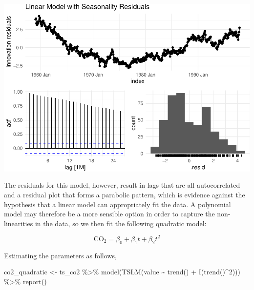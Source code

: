 \documentclass[AER]{AEA}
\newenvironment{Shaded}{\begin{snugshade}}{\end{snugshade}}
\newcommand{\DecValTok}[1]{\textcolor[rgb]{0.00,0.00,0.81}{#1}}
\newcommand{\FunctionTok}[1]{\textcolor[rgb]{0.00,0.00,0.00}{#1}}
\newcommand{\NormalTok}[1]{#1}
\newcommand{\OtherTok}[1]{\textcolor[rgb]{0.56,0.35,0.01}{#1}}
\newcommand{\SpecialCharTok}[1]{\textcolor[rgb]{0.00,0.00,0.00}{#1}}
\begin{document}
\includegraphics{co2_1997_Qian_files/figure-latex/seasonalized model residulas-1.pdf}

The residuals for this model, however, result in lags that are all
autocorrelated and a residual plot that forms a parabolic pattern, which
is evidence against the hypothesis that a linear model can appropriately
fit the data. A polynomial model may therefore be a more sensible option
in order to capture the non-linearities in the data, so we then fit the
following quadratic model:

\begin{equation}
\label{eq:one}
\text{CO}_{2} = \beta_0 + \beta_1 t + \beta_2 t^2
\end{equation}

Estimating the parameters as follows,

\begin{Shaded}
\begin{Highlighting}[]
\NormalTok{co2\_quadratic }\OtherTok{\textless{}{-}}\NormalTok{ ts\_co2 }\SpecialCharTok{\%\textgreater{}\%} 
    \FunctionTok{model}\NormalTok{(}\FunctionTok{TSLM}\NormalTok{(value }\SpecialCharTok{\textasciitilde{}} \FunctionTok{trend}\NormalTok{() }\SpecialCharTok{+} \FunctionTok{I}\NormalTok{(}\FunctionTok{trend}\NormalTok{()}\SpecialCharTok{\^{}}\DecValTok{2}\NormalTok{))) }\SpecialCharTok{\%\textgreater{}\%} 
    \FunctionTok{report}\NormalTok{()}
\end{Highlighting}
\end{Shaded}
\end{document}
